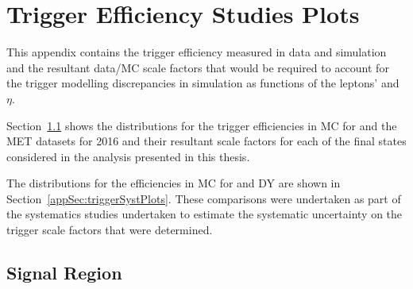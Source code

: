 \chapter{Trigger Efficiency Studies Plots}\label{app:triggerEff}
This appendix contains the trigger efficiency measured in data and simulation and the resultant data/MC scale factors that would be required to account for the trigger modelling discrepancies in simulation as functions of the leptons' \pT and $\eta$.

Section~\ref{appSec:triggerEffPlots} shows the distributions for the trigger efficiencies in MC for \ttbar and the MET datasets for 2016 and their resultant scale factors for each of the final states considered in the analysis presented in this thesis.

The distributions for the efficiencies in MC for \ttbar and DY are shown in Section~\ref{appSec:triggerSystPlots}. 
These comparisons were undertaken as part of the systematics studies undertaken to estimate the systematic uncertainty on the trigger scale factors that were determined.

\clearpage
\newpage

\section{Signal Region}\label{appSec:triggerEffPlots}


